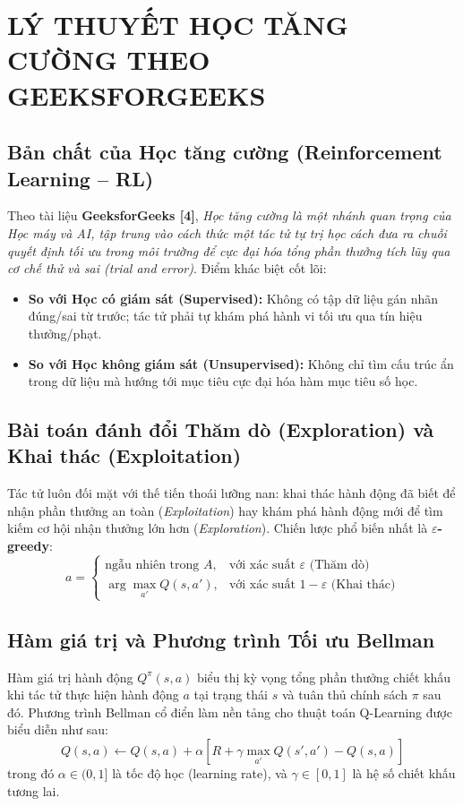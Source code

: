\documentclass[12pt,a4paper]{article}
\begin{document}
\clearpage


\section{LÝ THUYẾT HỌC TĂNG CƯỜNG THEO GEEKSFORGEEKS}

\subsection{Bản chất của Học tăng cường (Reinforcement Learning -- RL)}
Theo tài liệu \textbf{GeeksforGeeks [4]}, \textit{Học tăng cường là một nhánh quan trọng của Học máy và AI, tập trung vào cách thức một tác tử tự trị học cách đưa ra chuỗi quyết định tối ưu trong môi trường để cực đại hóa tổng phần thưởng tích lũy qua cơ chế thử và sai (trial and error)}. Điểm khác biệt cốt lõi:
\begin{itemize}
    \item \textbf{So với Học có giám sát (Supervised):} Không có tập dữ liệu gán nhãn đúng/sai từ trước; tác tử phải tự khám phá hành vi tối ưu qua tín hiệu thưởng/phạt.
    \item \textbf{So với Học không giám sát (Unsupervised):} Không chỉ tìm cấu trúc ẩn trong dữ liệu mà hướng tới mục tiêu cực đại hóa hàm mục tiêu số học.
\end{itemize}

\subsection{Bài toán đánh đổi Thăm dò (Exploration) và Khai thác (Exploitation)}
Tác tử luôn đối mặt với thế tiến thoái lưỡng nan: khai thác hành động đã biết để nhận phần thưởng an toàn (\textit{Exploitation}) hay khám phá hành động mới để tìm kiếm cơ hội nhận thưởng lớn hơn (\textit{Exploration}). Chiến lược phổ biến nhất là \textbf{$\varepsilon$-greedy}:
\[
a = \begin{cases} 
\text{ngẫu nhiên trong } A, & \text{với xác suất } \varepsilon \text{ (Thăm dò)} \\
\arg\max_{a'} Q(s, a'), & \text{với xác suất } 1 - \varepsilon \text{ (Khai thác)}
\end{cases}
\]

\subsection{Hàm giá trị và Phương trình Tối ưu Bellman}
Hàm giá trị hành động $Q^\pi(s, a)$ biểu thị kỳ vọng tổng phần thưởng chiết khấu khi tác tử thực hiện hành động $a$ tại trạng thái $s$ và tuân thủ chính sách $\pi$ sau đó. Phương trình Bellman cổ điển làm nền tảng cho thuật toán Q-Learning được biểu diễn như sau:
\[
Q(s, a) \leftarrow Q(s, a) + \alpha \left[ R + \gamma \max_{a'} Q(s', a') - Q(s, a) \right]
\]
trong đó $\alpha \in (0, 1]$ là tốc độ học (learning rate), và $\gamma \in [0, 1]$ là hệ số chiết khấu tương lai.
\end{document}
